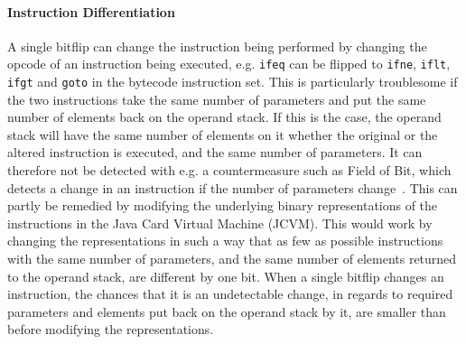 \paragraph{Instruction Differentiation} 
A single bitflip can change the instruction being performed by changing the opcode of an instruction being executed, e.g. \texttt{ifeq} can be flipped to \texttt{ifne}, \texttt{iflt}, \texttt{ifgt} and \texttt{goto} in the \jc bytecode instruction set. This is particularly troublesome if the two instructions take the same number of parameters and put the same number of elements back on the operand stack. If this is the case, the operand stack will have the same number of elements on it whether the original or the altered instruction is executed, and the same number of parameters. It can therefore not be detected with e.g. a countermeasure such as Field of Bit, which detects a change in an instruction if the number of parameters change~\cite[p. 16]{javasec}.
This can partly be remedied by modifying the underlying binary representations of the instructions in the Java Card Virtual Machine (JCVM).
This would work by changing the representations in such a way that as few as possible instructions with the same number of parameters, and the same number of elements returned to the operand stack, are different by one bit. 
When a single bitflip changes an instruction, the chances that it is an undetectable change, in regards to required parameters and elements put back on the operand stack by it, are smaller than before modifying the representations.

